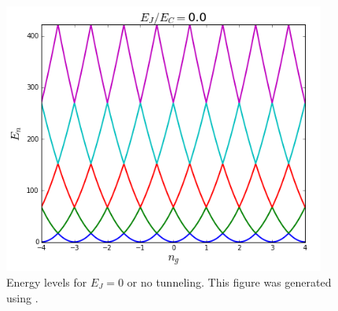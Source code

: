 \begin{figure}
\centering
\includegraphics[width=300pt]{Figures/EjEc=0.png}
\decoRule
\caption[Energy Level for $E_J=0$]{Energy levels for $E_J=0$ or no tunneling. This figure was generated using \cite{Johansson2012}.}
\label{fig:CPB EJ=0}
\end{figure}

